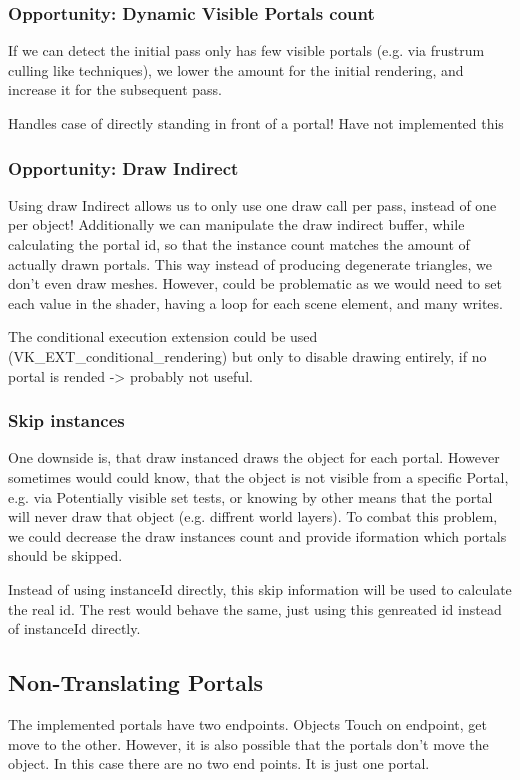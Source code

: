 \subsubsection{Opportunity: Dynamic Visible Portals count}
If we can detect the initial pass only has few visible portals (e.g. via frustrum culling like techniques), we lower the amount for the initial rendering, and increase it for
the subsequent pass.

Handles case of directly standing in front of a portal!
Have not implemented this

\subsubsection{Opportunity: Draw Indirect}
Using draw Indirect allows us to only use one draw call per pass, instead of one per object!
Additionally we can manipulate the draw indirect buffer, while calculating the portal id, so that the instance count matches the amount of actually drawn portals.
This way instead of producing degenerate triangles, we don't even draw meshes.
However, could be problematic as we would need to set each value in the shader, having a loop for each scene element, and many writes.

The conditional execution extension could be used (VK\_EXT\_conditional\_rendering) but only to disable drawing entirely, if no portal is rended -> probably not useful.

\subsubsection{Skip instances}
One downside is, that draw instanced draws the object for each portal. However sometimes would could know, that the object is not visible from a specific Portal, e.g. via Potentially visible set tests, or knowing by other means that the portal will never draw that object (e.g. diffrent world layers).
To combat this problem, we could decrease the draw instances count and provide iformation which portals should be skipped.

Instead of using instanceId directly, this skip information will be used to calculate the real id. The rest would behave the same, just using this genreated id instead of instanceId directly.



\subsection{Non-Translating Portals}
The implemented portals have two endpoints. Objects Touch on endpoint, get move to the other. However, it is also possible that the portals don't move the object. In this case there are no two end points. It is just one portal.

